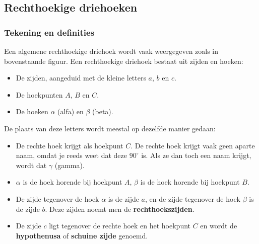 \subsection{Rechthoekige driehoeken}


\subsubsection{Tekening en definities}



Een algemene rechthoekige driehoek wordt vaak weergegeven zoals in bovenstaande figuur. Een rechthoekige driehoek bestaat uit zijden en hoeken:
\begin{itemize}
	\item De zijden, aangeduid met de kleine letters $a$, $b$ en $c$.
	\item De hoekpunten $A$, $B$ en $C$.
	\item De hoeken $\alpha$ (alfa) en $\beta$ (beta).
\end{itemize}

De plaats van deze letters wordt meestal op dezelfde manier gedaan:
\begin{itemize}
	\item De rechte hoek krijgt als hoekpunt $C$. De rechte hoek krijgt vaak geen aparte naam, omdat je reeds weet dat deze $90^\circ$ is. Als ze dan toch een naam krijgt, wordt dat $\gamma$ (gamma).
	\item $\alpha$ is de hoek horende bij hoekpunt $A$, $\beta$ is de hoek horende bij hoekpunt $B$.
	\item De zijde tegenover de hoek $\alpha$ is de zijde $a$, en de zijde tegenover de hoek $\beta$ is de zijde $b$. Deze zijden noemt men de \textbf{rechthoekszijden}.
	\item De zijde $c$ ligt tegenover de rechte hoek en het hoekpunt $C$ en wordt de \textbf{hypothenusa} of \textbf{schuine zijde} genoemd.
\end{itemize}

